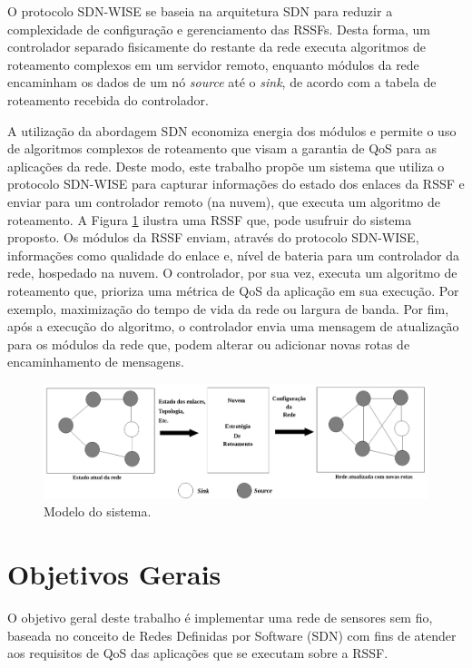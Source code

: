 O protocolo \ac{SDN-WISE} se baseia na arquitetura \ac{SDN} para reduzir a complexidade de configuração e gerenciamento das \ac{RSSF}s. Desta forma, um controlador separado fisicamente do restante da rede executa algoritmos de roteamento complexos em um servidor remoto, enquanto módulos da rede encaminham os dados de um nó \textit{source} até o \textit{sink}, de acordo com a tabela de roteamento recebida do controlador.

A utilização da abordagem \ac{SDN} economiza energia dos módulos e permite o uso de algoritmos complexos de roteamento que visam a garantia de \ac{QoS} para as aplicações da rede. Deste modo, este trabalho propõe um sistema que utiliza o protocolo \ac{SDN-WISE} para capturar informações do estado dos enlaces da \ac{RSSF} e enviar para um controlador remoto (na nuvem), que executa um algoritmo de roteamento. A Figura \ref{modeloDoSistema} ilustra uma \ac{RSSF} que, pode usufruir do sistema proposto. Os módulos da \ac{RSSF} enviam, através do protocolo \ac{SDN-WISE}, informações como qualidade do enlace e, nível de bateria para um controlador da rede, hospedado na nuvem. O controlador, por sua vez, executa um algoritmo de roteamento que, prioriza uma métrica de \ac{QoS} da aplicação em sua execução. Por exemplo, maximização do tempo de vida da rede ou largura de banda. Por fim, após a execução do algoritmo, o controlador envia uma mensagem de atualização para os módulos da rede que, podem alterar ou adicionar novas rotas de encaminhamento de mensagens.

\begin{figure}[h!]
    \centering
    \includegraphics[width=15cm]{figs/overviewDoSistema.png}
    \caption{Modelo do sistema.}
    \label{modeloDoSistema}
\end{figure}

\section{Objetivos Gerais}
\label{s_introducao_OG}

O objetivo geral deste trabalho é implementar uma rede de sensores sem fio, baseada no conceito de Redes Definidas por Software (SDN) com fins de atender aos requisitos de \ac{QoS} das aplicações que se executam sobre a \ac{RSSF}.

